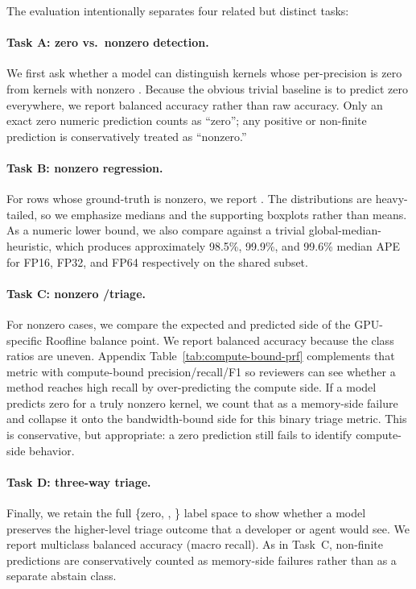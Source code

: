 The evaluation intentionally separates four related but distinct tasks:

\paragraph{Task A: zero vs.\ nonzero detection.}
We first ask whether a model can distinguish kernels whose per-precision \rai is zero from kernels with nonzero \rai.
Because the obvious trivial baseline is to predict zero everywhere, we report balanced accuracy rather than raw accuracy.
Only an exact zero numeric prediction counts as ``zero''; any positive or non-finite prediction is conservatively treated as ``nonzero.''

\paragraph{Task B: nonzero \rai regression.}
For rows whose ground-truth \rai is nonzero, we report \medianape.
The distributions are heavy-tailed, so we emphasize medians and the supporting boxplots rather than means.
As a numeric lower bound, we also compare against a trivial global-median-\rai heuristic, which produces approximately 98.5\%, 99.9\%, and 99.6\% median APE for FP16, FP32, and FP64 respectively on the shared subset.

\paragraph{Task C: nonzero \bandwidthbound/\computebound triage.}
For nonzero cases, we compare the expected and predicted side of the GPU-specific Roofline balance point.
We report balanced accuracy because the class ratios are uneven.
Appendix Table~\ref{tab:compute-bound-prf} complements that metric with compute-bound precision/recall/F1 so reviewers can see whether a method reaches high recall by over-predicting the compute side.
If a model predicts zero for a truly nonzero kernel, we count that as a memory-side failure and collapse it onto the bandwidth-bound side for this binary triage metric.
This is conservative, but appropriate: a zero prediction still fails to identify compute-side behavior.

\paragraph{Task D: three-way triage.}
Finally, we retain the full \{zero, \bandwidthbound, \computebound\} label space to show whether a model preserves the higher-level triage outcome that a developer or agent would see.
We report multiclass balanced accuracy (macro recall).
As in Task~C, non-finite predictions are conservatively counted as memory-side failures rather than as a separate abstain class.

